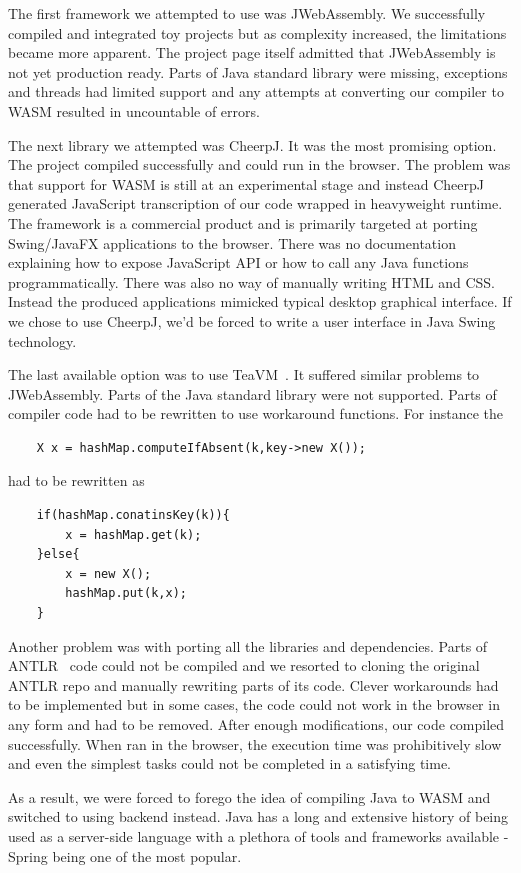 The first framework we attempted to use was JWebAssembly. We successfully compiled and integrated toy projects but as complexity increased, the limitations became more apparent. The project page itself admitted that JWebAssembly is not yet production ready. Parts of Java standard library were missing, exceptions and threads had limited support and any attempts at converting our compiler to WASM resulted in uncountable of errors.

The next library we attempted was CheerpJ. It was the most promising option. The project compiled successfully and could run in the browser. The problem was that support for WASM is still at an experimental stage and instead CheerpJ generated JavaScript transcription of our code wrapped in heavyweight runtime. The framework is a commercial product and is primarily targeted at porting Swing/JavaFX applications to the browser. There was no documentation explaining how to expose JavaScript API or how to call any Java functions programmatically. There was also no way of manually writing HTML and CSS. Instead the produced applications mimicked typical desktop graphical interface. If we chose to use CheerpJ, we'd be forced to write a user interface in Java Swing technology.

The last available option was to use TeaVM\  \cite{teavm}. It suffered similar problems to JWebAssembly. Parts of the Java standard library were not supported. Parts of compiler code had to be rewritten to use workaround functions. For instance
the
\begin{lstlisting}
	X x = hashMap.computeIfAbsent(k,key->new X());
\end{lstlisting}
had to be rewritten as
\begin{lstlisting}
	if(hashMap.conatinsKey(k)){
		x = hashMap.get(k);
	}else{
		x = new X();
		hashMap.put(k,x);
	}
\end{lstlisting}
Another problem was with porting all the libraries and dependencies.
Parts of ANTLR\  \cite{antlr} code could not be compiled and we resorted to cloning the original ANTLR repo and manually rewriting parts of its code. Clever workarounds had to be implemented but in some cases, the code could not work in the browser in any form and had to be removed.
After enough modifications, our code compiled successfully.
When ran in the browser, the execution time was prohibitively slow and even the simplest tasks could not be completed in a satisfying time.

As a result, we were forced to forego the idea of compiling Java to WASM and switched to using backend instead. Java has a long and extensive history of being used as a server-side language with a plethora of tools and frameworks available - Spring being one of the most popular.


